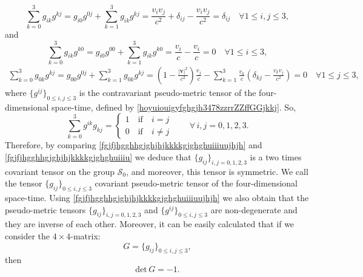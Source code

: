 \documentclass{article}
\theoremstyle{definition}
\theoremstyle{remark}
\renewcommand{\vec}[1]{\mathbf{#1}}
\newcommand{\er}{\eqref}
\newcommand{\er}{\eqref}
\begin{document}
\begin{equation*}
\sum_{k=0}^{3}g_{ik}g^{kj}=g_{i0}g^{0j}+\sum_{k=1}^{3}g_{ik}g^{kj}=
\frac{v_iv_j}{c^2}+\delta_{ij}-\frac{v_iv_j}{c^2}=\delta_{ij}\quad\forall
1\leq i,j\leq 3,
\end{equation*}
and
\begin{equation*}
\sum_{k=0}^{3}g_{ik}g^{k0}=g_{i0}g^{00}+\sum_{k=1}^{3}g_{ik}g^{k0}=\frac{v_i}{c}-\frac{v_i}{c}=0
\quad\forall 1\leq i\leq 3,
\end{equation*}
\begin{multline*}
\sum_{k=0}^{3}g_{0k}g^{kj}=g_{00}g^{0j}+\sum_{k=1}^{3}g_{0k}g^{kj}=
\left(1-\frac{|\vec v|^2}{c^2}\right)\frac{v_j}{c}
-\sum_{k=1}^{3}\frac{v_k}{c}\left(\delta_{kj}-\frac{v_kv_j}{c^2}\right)=0
\quad\forall 1\leq j\leq 3,
\end{multline*}
where $\{g^{ij}\}_{0\leq i,j\leq 3}$ is the contravariant
pseudo-metric tensor of the four-dimensional space-time, defined by
\er{hoyuiouigyfghgjh3478zzrrZZffGGjkkj}. So,
\begin{equation}\label{fgjfjhgghhgjghjhjkkkkgjghghuiiiuujhjh}
\sum_{k=0}^{3}g^{ik}g_{kj}=\begin{cases}
1\quad\text{if}\quad i=j\\
0\quad\text{if}\quad i\neq j
\end{cases}\quad\quad\forall\, i,j=0,1,2,3.
\end{equation}
Therefore, by comparing \er{fgjfjhgghhgjghjhjkkkkgjghghuiiiuujhjh}
and \er{fgjfjhgghhgjghjhjkkkkgjghghuiiiu} we deduce that
$\{g_{ij}\}_{i,j=0,1,2,3}$ is a two times covariant tensor on the
group $\mathcal{S}_0$, and moreover, this tensor is symmetric. We
call the tensor $\{g_{ij}\}_{0\leq i,j\leq 3}$ covariant
pseudo-metric tensor of the four-dimensional space-time. Using
\er{fgjfjhgghhgjghjhjkkkkgjghghuiiiuujhjh} we also obtain that the
pseudo-metric tensors $\{g_{ij}\}_{i,j=0,1,2,3}$ and
$\{g^{ij}\}_{0\leq i,j\leq 3}$ are non-degenerate and they are
inverse of each other. Moreover, it can be easily calculated that if
we consider the $4\times 4$-matrix:
\begin{equation}\label{fgjfjhgghhgjghjhjkkkkgjghghuiiiuujhjhjklj}
G=\{g_{ij}\}_{0\leq i,j\leq 3},
\end{equation}
then
\begin{equation}\label{fgjfjhgghhgjghjhjkkkkgjghghuiiiuujhjh1}
\text{det}\,G=-1.
\end{equation}
\end{document}

